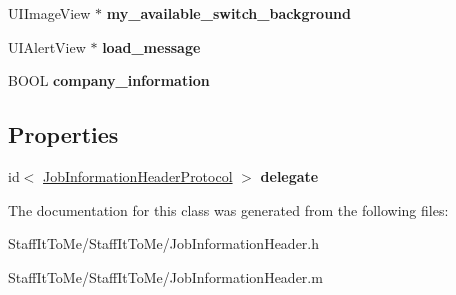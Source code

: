 \begin{DoxyCompactItemize}
\item 
\hypertarget{interface_job_information_header_a585ef81d244f966fc3b878df0e7db4c2}{
\-U\-I\-Image\-View $\ast$ {\bfseries my\-\_\-available\-\_\-switch\-\_\-background}}
\label{interface_job_information_header_a585ef81d244f966fc3b878df0e7db4c2}

\item 
\hypertarget{interface_job_information_header_a95e04749dcb98128d71c50cac1a15d9e}{
\-U\-I\-Alert\-View $\ast$ {\bfseries load\-\_\-message}}
\label{interface_job_information_header_a95e04749dcb98128d71c50cac1a15d9e}

\item 
\hypertarget{interface_job_information_header_ada18c73180c3707cf65a177baa1ed124}{
\-B\-O\-O\-L {\bfseries company\-\_\-information}}
\label{interface_job_information_header_ada18c73180c3707cf65a177baa1ed124}

\end{DoxyCompactItemize}
\subsection*{\-Properties}
\begin{DoxyCompactItemize}
\item 
\hypertarget{interface_job_information_header_a4970df12157a55aa643b8da78a7f99f1}{
id$<$ \hyperlink{protocol_job_information_header_protocol-p}{\-Job\-Information\-Header\-Protocol} $>$ {\bfseries delegate}}
\label{interface_job_information_header_a4970df12157a55aa643b8da78a7f99f1}

\end{DoxyCompactItemize}


\-The documentation for this class was generated from the following files\-:\begin{DoxyCompactItemize}
\item 
\-Staff\-It\-To\-Me/\-Staff\-It\-To\-Me/\-Job\-Information\-Header.\-h\item 
\-Staff\-It\-To\-Me/\-Staff\-It\-To\-Me/\-Job\-Information\-Header.\-m\end{DoxyCompactItemize}

